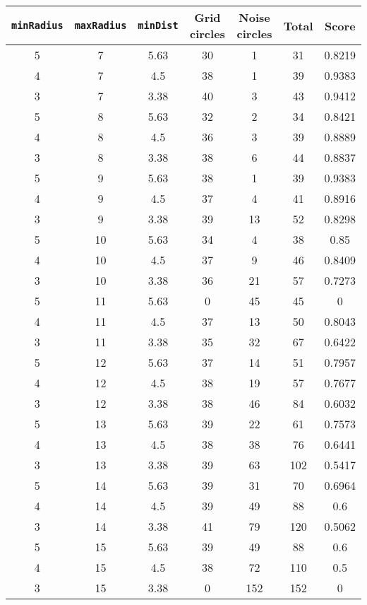 \documentclass[letterpaper, 12pt]{article}
\begin{document}
\begin{longtable}{|c|c|c|c|c|c|c|}
\hline
\textbf{\texttt{minRadius}} & \textbf{\texttt{maxRadius}} & \textbf{\texttt{minDist}} & \textbf{Grid circles} & \textbf{Noise circles} & \textbf{Total} & \textbf{Score} \\
\hline
5 & 7 & 5.63 & 30 & 1 & 31 & 0.8219 \\
\hline
4 & 7 & 4.5 & 38 & 1 & 39 & 0.9383 \\
\hline
3 & 7 & 3.38 & 40 & 3 & 43 & 0.9412 \\
\hline
5 & 8 & 5.63 & 32 & 2 & 34 & 0.8421 \\
\hline
4 & 8 & 4.5 & 36 & 3 & 39 & 0.8889 \\
\hline
3 & 8 & 3.38 & 38 & 6 & 44 & 0.8837 \\
\hline
5 & 9 & 5.63 & 38 & 1 & 39 & 0.9383 \\
\hline
4 & 9 & 4.5 & 37 & 4 & 41 & 0.8916 \\
\hline
3 & 9 & 3.38 & 39 & 13 & 52 & 0.8298 \\
\hline
5 & 10 & 5.63 & 34 & 4 & 38 & 0.85 \\
\hline
4 & 10 & 4.5 & 37 & 9 & 46 & 0.8409 \\
\hline
3 & 10 & 3.38 & 36 & 21 & 57 & 0.7273 \\
\hline
5 & 11 & 5.63 & 0 & 45 & 45 & 0 \\
\hline
4 & 11 & 4.5 & 37 & 13 & 50 & 0.8043 \\
\hline
3 & 11 & 3.38 & 35 & 32 & 67 & 0.6422 \\
\hline
5 & 12 & 5.63 & 37 & 14 & 51 & 0.7957 \\
\hline
4 & 12 & 4.5 & 38 & 19 & 57 & 0.7677 \\
\hline
3 & 12 & 3.38 & 38 & 46 & 84 & 0.6032 \\
\hline
5 & 13 & 5.63 & 39 & 22 & 61 & 0.7573 \\
\hline
4 & 13 & 4.5 & 38 & 38 & 76 & 0.6441 \\
\hline
3 & 13 & 3.38 & 39 & 63 & 102 & 0.5417 \\
\hline
5 & 14 & 5.63 & 39 & 31 & 70 & 0.6964 \\
\hline
4 & 14 & 4.5 & 39 & 49 & 88 & 0.6 \\
\hline
3 & 14 & 3.38 & 41 & 79 & 120 & 0.5062 \\
\hline
5 & 15 & 5.63 & 39 & 49 & 88 & 0.6 \\
\hline
4 & 15 & 4.5 & 38 & 72 & 110 & 0.5 \\
\hline
3 & 15 & 3.38 & 0 & 152 & 152 & 0 \\

\end{longtable}
\end{document}
